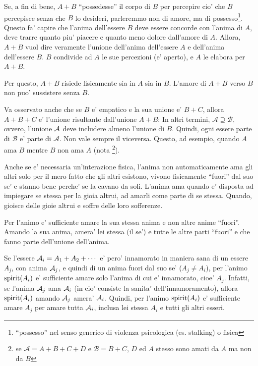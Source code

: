Se, a fin di bene, $A+B$ ``possedesse'' il corpo di $B$ per percepire cio' che $B$ percepisce senza che $B$ lo desideri, parleremmo non di amore, ma di possesso\footnote{``possesso'' nel senso generico di violenza psicologica (es. stalking) o fisica}. Questo fa' capire che l'anima dell'essere $B$ deve essere concorde con l'anima di $A$, deve trarre quanto piu' piacere e quanto meno dolore dall'amore di $A$. Allora, $A+B$ vuol dire veramente l'unione dell'anima dell'essere $A$ e dell'anima dell'essere $B$. $B$ condivide ad $A$ le sue percezioni (e' aperto), e $A$ le elabora per $A+B$. 

Per questo, $A+B$ risiede fisicamente sia in $A$ sia in $B$. L'amore di $A+B$ verso $B$ non puo' sussistere senza $B$. 

Va osservato anche che se $B$ e' empatico e la sua unione e' $B+C$, allora $A+B+C$ e' l'unione risultante dall'unione $A+B$:
In altri termini, $\mathcal{A} \supseteq \mathcal{B}$, ovvero, l'unione $\mathcal{A}$ deve includere almeno l'unione di $B$. Quindi, ogni essere parte di $\mathcal{B}$ e' parte di $\mathcal{A}$. Non vale sempre il viceversa. Questo, ad esempio, quando $A$ ama $B$ mentre $B$ non ama $A$  (nota \footnote{se $\mathcal{A}=A+B+C+D$ e $\mathcal{B}=B+C$, $D$ ed $A$ stesso sono amati da $A$ ma non da $B$}).

Anche se e' necessaria un'interazione fisica, l'anima non automaticamente ama gli altri solo per il mero fatto che gli altri esistono, vivono fisicamente ``fuori'' dal suo se' e stanno bene perche' se la cavano da soli. L'anima ama quando e' disposta ad impiegare se stessa per la gioia altrui, ad amarli come parte di se stessa. Quando, gioisce delle gioie altrui e soffre delle loro sofferenze. 

Per l'animo e' sufficiente amare la sua stessa anima e non altre anime ``fuori''. Amando la sua anima, amera' lei stessa (il se') e tutte le altre parti ``fuori'' e che fanno parte dell'unione dell'anima.

Se l'essere $\mathcal{A}_i=A_1+A_2+\cdots$ e' pero' innamorato in maniera sana di un essere $A_j$, con anima $\mathcal{A}_j$, e quindi di un anima fuori dal suo se' ($A_j\ne A_i$), per l'animo $\textrm{spirit}(A_i)$ e' sufficiente amare solo l'anima di cui e' innamorato, cioe' $A_j$. Infatti, se l'anima $\mathcal{A}_j$ ama $\mathcal{A}_i$ (in cio' consiste la sanita' dell'innamoramento), allora $\textrm{spirit}(A_i)$ amando $\mathcal{A}_j$ amera' $\mathcal{A}_i$.
Quindi, per l'animo $\textrm{spirit}(A_i)$ e' sufficiente amare $A_j$ per amare tutta $\mathcal{A}_i$, inclusa lei stessa $A_i$ e tutti gli altri esseri.

